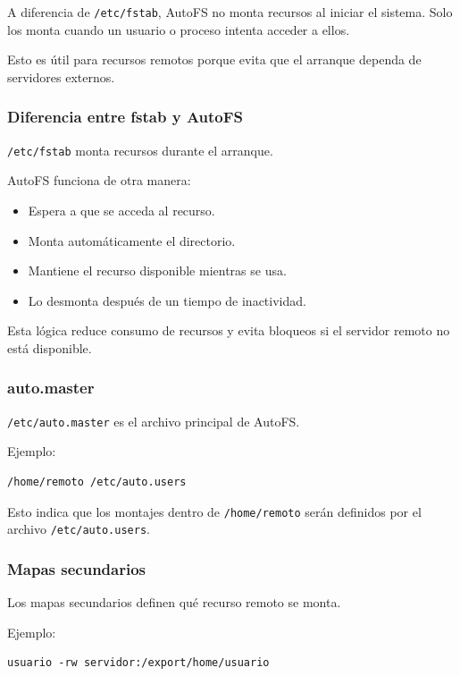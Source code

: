 \documentclass[11pt, letterpaper]{article}
\begin{document}
A diferencia de \texttt{/etc/fstab}, AutoFS no monta recursos al iniciar el sistema. Solo los monta cuando un usuario o proceso intenta acceder a ellos.

Esto es útil para recursos remotos porque evita que el arranque dependa de servidores externos.
\subsubsection{Diferencia entre fstab y AutoFS}
\label{sec:org6b72024}

\texttt{/etc/fstab} monta recursos durante el arranque.

AutoFS funciona de otra manera:

\begin{itemize}
\item Espera a que se acceda al recurso.
\item Monta automáticamente el directorio.
\item Mantiene el recurso disponible mientras se usa.
\item Lo desmonta después de un tiempo de inactividad.
\end{itemize}

Esta lógica reduce consumo de recursos y evita bloqueos si el servidor remoto no está disponible.
\subsubsection{auto.master}
\label{sec:org6190d3b}

\texttt{/etc/auto.master} es el archivo principal de AutoFS.

Ejemplo:

\begin{verbatim}
/home/remoto /etc/auto.users
\end{verbatim}

Esto indica que los montajes dentro de \texttt{/home/remoto} serán definidos por el archivo \texttt{/etc/auto.users}.
\subsubsection{Mapas secundarios}
\label{sec:orgf43fb84}

Los mapas secundarios definen qué recurso remoto se monta.

Ejemplo:

\begin{verbatim}
usuario -rw servidor:/export/home/usuario
\end{verbatim}
\end{document}
